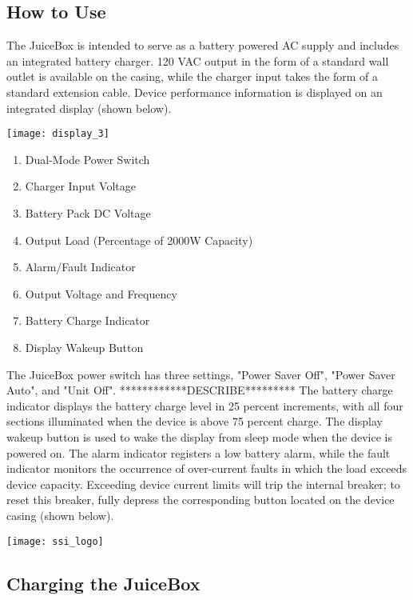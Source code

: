 \documentclass[../jb_user_manual.tex]{subfiles}
\begin{document}
\subsection{\Large{How to Use}} 

The JuiceBox is intended to serve as a battery powered AC supply and includes an integrated battery charger.  120 VAC output in the form of a standard wall outlet is available on the casing, while the charger input takes the form of a standard extension cable.  Device performance information is displayed on an integrated display (shown below).

\vspace{3mm}
\texttt{[image: display\_3]}
\vspace{3mm}

\begin{enumerate}
	\item{Dual-Mode Power Switch}
	\item{Charger Input Voltage}
	\item{Battery Pack DC Voltage}
	\item{Output Load (Percentage of 2000W Capacity)}
	\item{Alarm/Fault Indicator}
	\item{Output Voltage and Frequency}
	\item{Battery Charge Indicator}
	\item{Display Wakeup Button}
\end{enumerate}

The JuiceBox power switch has three settings, "Power Saver Off", "Power Saver Auto", and "Unit Off". ************DESCRIBE*********  The battery charge indicator displays the battery charge level in 25 percent increments, with all four sections illuminated when the device is above 75 percent charge.  The display wakeup button is used to wake the display from sleep mode when the device is powered on.  The alarm indicator registers a low battery alarm, while the fault indicator monitors the occurrence of over-current faults in which the load exceeds device capacity.  Exceeding device current limits will trip the internal breaker; to reset this breaker, fully depress the corresponding button located on the device casing (shown below).

\vspace{3mm}
\texttt{[image: ssi\_logo]}
\vspace{3mm}

\subsection{\Large{Charging the JuiceBox}}
\end{document}
